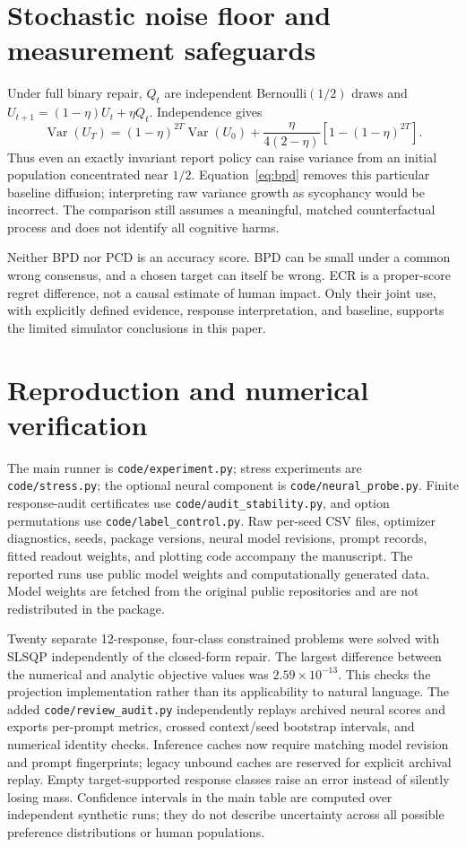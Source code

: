\documentclass[10pt]{article}
\newcommand{\Var}{\operatorname{Var}}
\begin{document}
\section{Stochastic noise floor and measurement safeguards}
Under full binary repair, $Q_t$ are independent Bernoulli$(1/2)$ draws
and $U_{t+1}=(1-\eta)U_t+\eta Q_t$. Independence gives
\begin{equation}
 \Var(U_T)=(1-\eta)^{2T}\Var(U_0)+
 \frac{\eta}{4(2-\eta)}[1-(1-\eta)^{2T}].
\end{equation}
Thus even an exactly invariant report policy can raise variance from an
initial population concentrated near $1/2$. Equation~\eqref{eq:bpd} removes
this particular baseline diffusion; interpreting raw variance growth as
sycophancy would be incorrect. The comparison still assumes a meaningful,
matched counterfactual process and does not identify all cognitive harms.

Neither BPD nor PCD is an accuracy score. BPD can be small under a common
wrong consensus, and a chosen target can itself be wrong. ECR is a proper-score
regret difference, not a causal estimate of human impact. Only their joint
use, with explicitly defined evidence, response interpretation, and baseline,
supports the limited simulator conclusions in this paper.

\section{Reproduction and numerical verification}\label{app:repro}
The main runner is \texttt{code/experiment.py}; stress experiments are
\texttt{code/stress.py}; the optional neural component is
\texttt{code/neural\_probe.py}. Finite response-audit certificates use
\texttt{code/audit\_stability.py}, and option permutations use
\texttt{code/label\_control.py}. Raw per-seed CSV files, optimizer diagnostics,
seeds, package versions, neural model revisions, prompt records, fitted
readout weights, and plotting code accompany the manuscript. The reported runs use public model weights and computationally generated data. Model weights are fetched from the original public repositories and
are not redistributed in the package.

Twenty separate 12-response, four-class constrained problems were solved
with SLSQP independently of the closed-form repair. The largest difference
between the numerical and analytic objective values was
$2.59\times10^{-13}$. This checks the projection implementation rather than
its applicability to natural language. The added \texttt{code/review\_audit.py} independently replays archived neural scores and exports per-prompt metrics, crossed context/seed bootstrap intervals, and numerical identity checks. Inference caches now require matching model revision and prompt fingerprints; legacy unbound caches are reserved for explicit archival replay. Empty target-supported response classes raise an error instead of silently losing mass. Confidence intervals in the main table are computed over independent synthetic runs; they do not describe uncertainty across all possible
preference distributions or human populations.
\end{document}
